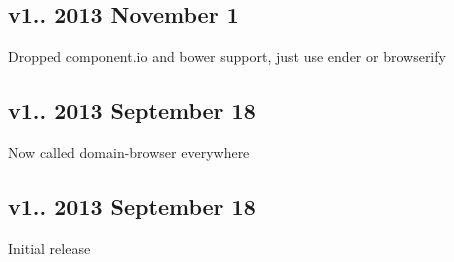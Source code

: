\subsection*{v1.. 2013 November 1}


\begin{DoxyItemize}
\item Dropped component.\+io and bower support, just use ender or browserify
\end{DoxyItemize}

\subsection*{v1.. 2013 September 18}


\begin{DoxyItemize}
\item Now called {\ttfamily domain-\/browser} everywhere
\end{DoxyItemize}

\subsection*{v1.. 2013 September 18}


\begin{DoxyItemize}
\item Initial release 
\end{DoxyItemize}